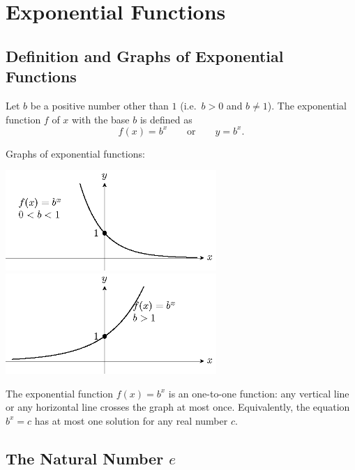 \documentclass[en,12pt]{elegantbook}
\let\BeginKnitrBlock\begin \let\EndKnitrBlock\end
\begin{document}
\hypertarget{exponential-functions}{%
\chapter{Exponential Functions}\label{exponential-functions}}

\hypertarget{definition-and-graphs-of-exponential-functions}{%
\section{Definition and Graphs of Exponential Functions}\label{definition-and-graphs-of-exponential-functions}}

Let \(b\) be a positive number other than \(1\) (i.e.~\(b>0\) and \(b\neq 1\)). The exponential function \(f\) of \(x\) with the base \(b\) is defined as
\[
f(x)=b^x\quad\quad\text{or}\quad\quad y=b^x.
\]

Graphs of exponential functions:

\includegraphics[width=0.6\textwidth,height=\textheight]{figs/tikz-example-exp-function-1.png}\\

\includegraphics[width=0.6\textwidth,height=\textheight]{figs/tikz-example-exp-function-2.png}\\

\BeginKnitrBlock{rmdnote}
The exponential function \(f(x)=b^x\) is an one-to-one function: any vertical line or any horizontal line crosses the graph at most once. Equivalently, the equation \(b^x=c\) has at most one solution for any real number \(c\).
\EndKnitrBlock{rmdnote}

\hypertarget{the-natural-number-e}{%
\section{\texorpdfstring{The Natural Number \(e\)}{The Natural Number e}}\label{the-natural-number-e}}
\end{document}
